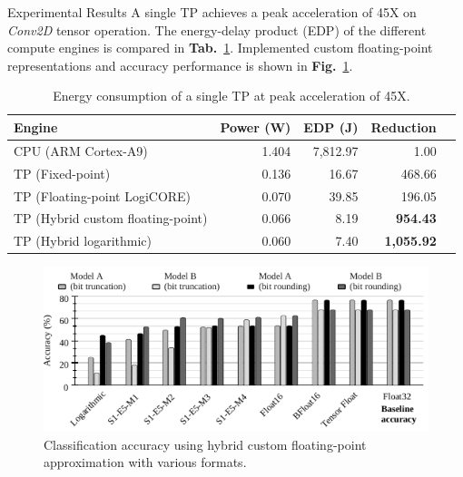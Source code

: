 \documentclass[final]{beamer}
\newlength{\onecolwid}
\newlength{\twocolwid}
\newcommand\fig[1]{\textbf{Fig.}~\ref{#1}}
\newcommand\tab[1]{\textbf{Tab.}~\ref{#1}}
\begin{document}
\begin{frame}[t]
\begin{columns}[t]
\begin{column}{\twocolwid}
\begin{columns}[t,totalwidth=\twocolwid]
\begin{column}{\onecolwid}
\begin{block}{Experimental Results}
	A single TP achieves a peak acceleration of 45X on \emph{Conv2D} tensor operation. The energy-delay product (EDP) of the different compute engines is compared in \tab{tab:energy}. Implemented custom floating-point representations and accuracy performance is shown in \fig{fig:accuracy}.
	\begin{table}[!htp]\centering
		\caption{Energy consumption of a single TP at peak acceleration of 45X.}\label{tab:energy}
		\scriptsize
		\begin{tabular}{lrrrr}\toprule
			Engine &Power (W) &EDP (J) &Reduction \\\midrule
			CPU (ARM Cortex-A9)&1.404 &7,812.97 &1.00 \\
			TP (Fixed-point) &0.136 &16.67 &468.66 \\
			TP (Floating-point LogiCORE) &0.070 &39.85 &196.05 \\
			TP (Hybrid custom floating-point) &0.066 &8.19 &\textbf{954.43} \\
			TP (Hybrid logarithmic) &0.060 &7.40 &\textbf{1,055.92} \\
			\bottomrule
		\end{tabular}
	\end{table}
	
	\begin{figure}
		\includegraphics[width=\linewidth]{../figures/all_models_accuracy.pdf}
		\caption{Classification accuracy using hybrid custom floating-point approximation with various formats.}
		\label{fig:accuracy}
	\end{figure}
\end{block}


\end{column} %

\end{columns} %



\end{column}
\end{columns}
\end{frame}
\end{document}

